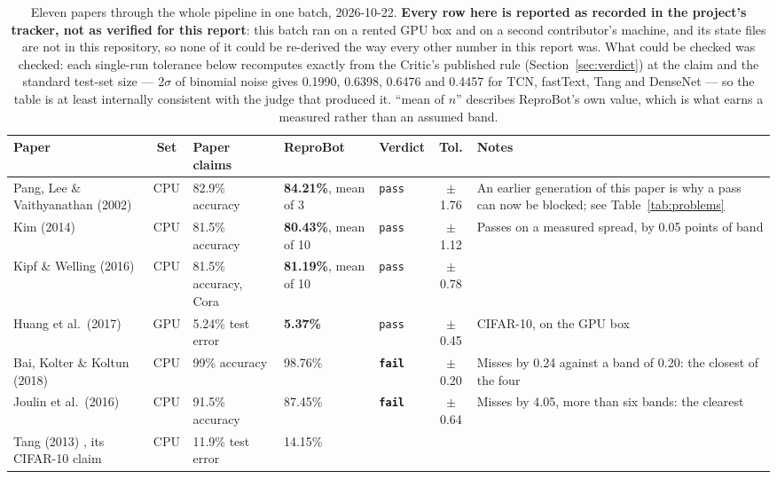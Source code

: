 \documentclass[10pt,twocolumn]{article}
\newcommand{\squeeze}{\setlength{\tabcolsep}{4pt}}
\begin{document}
\begin{table}[tbp]
\centering
\small
\caption{Eleven papers through the whole pipeline in one batch, 2026-10-22. \textbf{Every row
here is reported as recorded in the project's tracker, not as verified for this report}: this
batch ran on a rented GPU box and on a second contributor's machine, and its state files are not
in this repository, so none of it could be re-derived the way every other number in this report
was. What could be checked was checked: each single-run tolerance below recomputes exactly from
the Critic's published rule (Section~\ref{sec:verdict}) at the claim and the standard test-set
size --- 2$\sigma$ of binomial noise gives 0.1990, 0.6398, 0.6476 and 0.4457 for TCN, fastText,
Tang and DenseNet --- so the table is at least internally consistent with the judge that produced
it. ``mean of $n$'' describes ReproBot's own value, which is what earns a measured rather than an
assumed band.}
\label{tab:batch}
\squeeze
\begin{tabular}{L{0.175\textwidth}cL{0.115\textwidth}L{0.13\textwidth}L{0.075\textwidth}cL{0.235\textwidth}}
\toprule
Paper & Set & Paper claims & ReproBot & Verdict & Tol. & Notes \\
\midrule
Pang, Lee \& Vaithyanathan (2002) \cite{pang2002thumbs} & CPU & 82.9\% accuracy &
  \textbf{84.21\%}, mean of 3 & \texttt{pass} & $\pm$1.76 & An earlier generation of this paper
  is why a pass can now be blocked; see Table~\ref{tab:problems} \\
Kim (2014) \cite{kim2014cnn} & CPU & 81.5\% accuracy & \textbf{80.43\%}, mean of 10 &
  \texttt{pass} & $\pm$1.12 & Passes on a measured spread, by 0.05 points of band \\
Kipf \& Welling (2016) \cite{kipf2017gcn} & CPU & 81.5\% accuracy, Cora &
  \textbf{81.19\%}, mean of 10 & \texttt{pass} & $\pm$0.78 & \\
Huang et al.\ (2017) \cite{huang2017densenet} & GPU & 5.24\% test error &
  \textbf{5.37\%} & \texttt{pass} & $\pm$0.45 & CIFAR-10, on the GPU box \\
\midrule
Bai, Kolter \& Koltun (2018) \cite{bai2018tcn} & CPU & 99\% accuracy & 98.76\% &
  \textbf{\texttt{fail}} & $\pm$0.20 & Misses by 0.24 against a band of 0.20: the closest of the
  four \\
Joulin et al.\ (2016) \cite{joulin2016fasttext} & CPU & 91.5\% accuracy & 87.45\% &
  \textbf{\texttt{fail}} & $\pm$0.64 & Misses by 4.05, more than six bands: the clearest \\
Tang (2013) \cite{tang2013dlsvm}, its CIFAR-10 claim & CPU & 11.9\% test error & 14.15\% &

\end{tabular}
\end{table}
\end{document}
